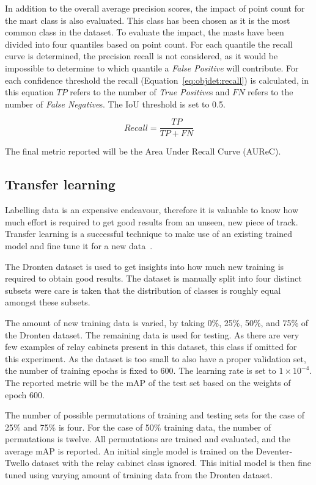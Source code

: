 In addition to the overall average precision scores, the impact of point count for the mast class is also evaluated. This class has been chosen as it is the most common class in the dataset. To evaluate the impact, the masts have been divided into four quantiles based on point count. For each quantile the recall curve is determined, the precision recall is not considered, as it would be impossible to determine to which quantile a \emph{False Positive} will contribute. For each confidence threshold the recall (Equation~\ref{eq:objdet:recall}) is calculated, in this equation $TP$ refers to the number of \emph{True Positive}s and $FN$ refers to the number of \emph{False Negative}s. The IoU threshold is set to 0.5.

\begin{equation}
    Recall = \frac{TP}{TP + FN} 
    \label{eq:objdet:recall}
\end{equation}

The final metric reported will be the Area Under Recall Curve (AUReC).


\subsection{Transfer learning}
Labelling data is an expensive endeavour, therefore it is valuable to know how much effort is required to get good results from an unseen, new piece of track. Transfer learning is a successful technique to make use of an existing trained model and fine tune it for a new data~\cite{razavian14,tajbakhsh16}.

The Dronten dataset is used to get insights into how much new training is required to obtain good results. The dataset is manually split into four distinct subsets were care is taken that the distribution of classes is roughly equal amongst these subsets. 

The amount of new training data is varied, by taking 0\%, 25\%, 50\%, and 75\% of the Dronten dataset. The remaining data is used for testing. As there are very few examples of relay cabinets present in this dataset, this class if omitted for this experiment. As the dataset is too small to also have a proper validation set, the number of training epochs is fixed to 600. The learning rate is set to $1\times 10^{-4}$. The reported metric will be the mAP of the test set based on the weights of epoch 600.

The number of possible permutations of training and testing sets for the case of 25\% and 75\% is four. For the case of 50\% training data, the number of permutations is twelve. All permutations are trained and evaluated, and the average mAP is reported. An initial single model is trained on the Deventer-Twello dataset with the relay cabinet class ignored. This initial model is then fine tuned using varying amount of training data from the Dronten dataset.

